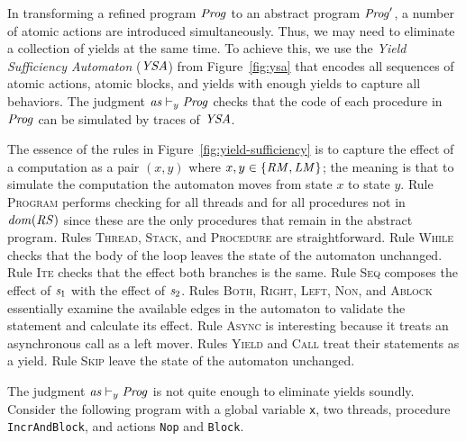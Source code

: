 In transforming a refined program $\mathit{Prog}$ to an abstract program $\mathit{Prog}'$, a number of atomic actions 
are introduced simultaneously.
Thus, we may need to eliminate a collection of yields at the same time.
To achieve this, we use the {\em Yield Sufficiency Automaton\/} ($\mathit{YSA}$) from Figure~\ref{fig:ysa} that encodes 
all sequences of atomic actions, atomic blocks, and yields with enough yields to capture all behaviors.
The judgment $\mathit{as} \vdash_y \mathit{Prog}$ checks that the code of each procedure in $\mathit{Prog}$ can be simulated by traces of $\mathit{YSA}$.

The essence of the rules in Figure~\ref{fig:yield-sufficiency}
is to capture the effect of a computation as a pair $(x,y)$ where $x,y \in \{\mathit{RM},\mathit{LM}\}$;
the meaning is that to simulate the computation the automaton moves from state $x$ to state $y$.
Rule \textsc{Program} performs checking for all threads and for all procedures not in $\mathit{dom}(\mathit{RS})$ since these are the 
only procedures that remain in the abstract program.
Rules \textsc{Thread}, \textsc{Stack}, and \textsc{Procedure} are straightforward.
Rule \textsc{While} checks that the body of the loop leaves the state of the automaton unchanged.
Rule \textsc{Ite} checks that the effect both branches is the same.
Rule \textsc{Seq} composes the effect of $\mathit{s}_1$ with the effect of $\mathit{s}_2$.
Rules \textsc{Both}, \textsc{Right}, \textsc{Left}, \textsc{Non}, and \textsc{Ablock} essentially 
examine the available edges in the automaton to validate the statement and calculate its effect.
Rule \textsc{Async} is interesting because it treats an asynchronous call as a left mover.
Rules \textsc{Yield} and \textsc{Call} treat their statements as a yield.
Rule \textsc{Skip} leave the state of the automaton unchanged.

The judgment $\mathit{as} \vdash_y \mathit{Prog}$ is not quite enough to eliminate yields soundly.
Consider the following program with a global variable {\tt x}, two threads, procedure {\tt IncrAndBlock},
and actions {\tt Nop} and {\tt Block}.

